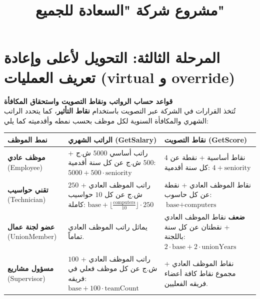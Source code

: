 \documentclass[14pt]{extarticle}
\title{مشروع شركة "السعادة للجميع"}
\begin{document}
\maketitle
\thispagestyle{fancy}

\section*{المرحلة الثالثة: التحويل لأعلى وإعادة تعريف العمليات (\textenglish{virtual} و \textenglish{override})}

\textbf{قواعد حساب الرواتب ونقاط التصويت واستحقاق المكافأة} \\
تُتخذ القرارات في الشركة عبر التصويت باستخدام \textbf{نقاط التأثير}، كما يتحدد الراتب الشهري والمكافأة السنوية لكل موظف بحسب نمطه وأقدميته كما يلي:

{\renewcommand{\arraystretch}{1.4}
\small
\begin{longtable}{|p{}|p{}|p{}|}
\hline
\textbf{نمط الموظف} & \textbf{الراتب الشهري (\textenglish{GetSalary})} & \textbf{نقاط التصويت (\textenglish{GetScore})} \\
\hline
\textbf{موظف عادي} \newline (\textenglish{Employee}) &
راتب أساسي $5000$ ش.ج + $500$ ش.ج عن كل سنة أقدمية: \newline
$5000 + 500 \cdot \text{seniority}$ &
$4$ نقاط أساسية + نقطة عن كل سنة أقدمية: \newline
$4 + \text{seniority}$ \\
\hline
\textbf{تقني حواسيب} \newline (\textenglish{Technician}) &
راتب الموظف العادي + $250$ ش.ج عن كل $10$ حواسيب كاملة: \newline
$\text{base} + \lfloor \frac{\text{computers}}{10} \rfloor \cdot 250$ &
نقاط الموظف العادي + نقطة عن كل حاسوب: \newline
$\text{base} + \text{computers}$ \\
\hline
\textbf{عضو لجنة عمال} \newline (\textenglish{UnionMember}) &
يماثل راتب الموظف العادي تماماً. &
\textbf{ضعف} نقاط الموظف العادي + نقطتان عن كل سنة باللجنة: \newline
$2 \cdot \text{base} + 2 \cdot \text{unionYears}$ \\
\hline
\textbf{مسؤول مشاريع} \newline (\textenglish{Supervisor}) &
راتب الموظف العادي + $100$ ش.ج عن كل موظف فعلي في فريقه: \newline
$\text{base} + 100 \cdot \text{teamCount}$ &
نقاط الموظف العادي + مجموع نقاط كافة أعضاء فريقه الفعليين. \\
\hline
\end{longtable}}
\end{document}

